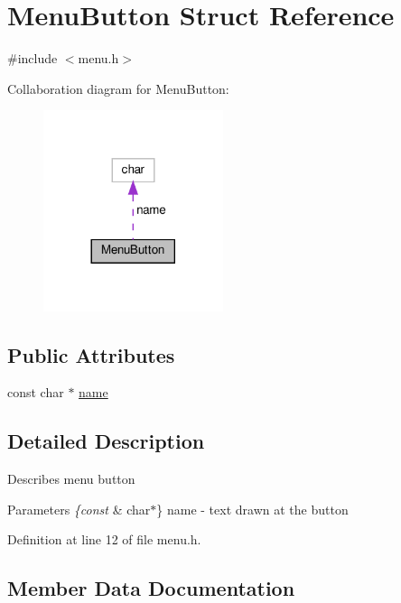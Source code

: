 \hypertarget{struct_menu_button}{}\section{Menu\+Button Struct Reference}
\label{struct_menu_button}


{\ttfamily \#include $<$menu.\+h$>$}



Collaboration diagram for Menu\+Button\+:
\nopagebreak
\begin{figure}[H]
\begin{center}
\leavevmode
\includegraphics[width=149pt]{struct_menu_button__coll__graph}
\end{center}
\end{figure}
\subsection*{Public Attributes}
\begin{DoxyCompactItemize}
\item 
const char $\ast$ \mbox{\hyperlink{struct_menu_button_ab20cd84f0366cbb5475c5b1e8de9d72c}{name}}
\end{DoxyCompactItemize}


\subsection{Detailed Description}
Describes menu button 
\begin{DoxyParams}{Parameters}
{\em \{const} & char$\ast$\} name -\/ text drawn at the button \\
\hline
\end{DoxyParams}


Definition at line 12 of file menu.\+h.



\subsection{Member Data Documentation}
\mbox{\label{struct_menu_button_ab20cd84f0366cbb5475c5b1e8de9d72c}} 
